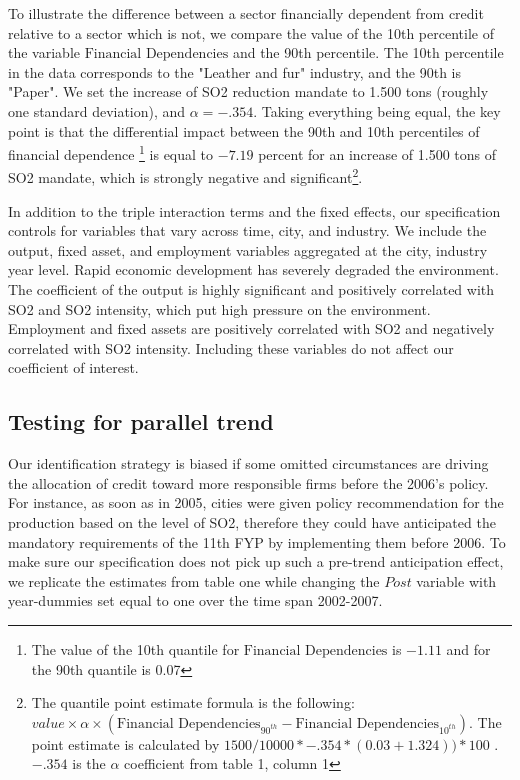 \documentclass[12pt]{article}
\begin{document}
To illustrate the difference between a sector financially dependent from credit relative to a sector which is not, we compare the value of the 10th percentile of the variable $\text{Financial Dependencies}$ and the 90th percentile. The 10th percentile in the data corresponds to the "Leather and fur" industry, and the 90th is "Paper". We set the increase of SO2 reduction mandate to 1.500 tons (roughly one standard deviation), and $\alpha= -.354$. Taking everything being equal, the key point is that the differential impact between the 90th and 10th percentiles of financial dependence \footnote{The value of the 10th quantile for  $\text{Financial Dependencies}$ is $-1.11$ and for the 90th quantile is 0.07} is equal to $-7.19$ percent for an increase of 1.500 tons of SO2 mandate, which is strongly negative and significant\footnote{The quantile point estimate formula is the following: $value \times \alpha \times (\text{Financial Dependencies}_{90^{th}} - \text{Financial Dependencies}_{10^{th}})$. The point estimate is calculated by $1500/10000 * -.354 * (0.03 + 1.324 )) * 100$ . $-.354$ is the $\alpha$ coefficient from table 1, column 1}.

In addition to the triple interaction terms and the fixed effects, our specification controls for variables that vary across time, city, and industry. We include the output, fixed asset, and employment variables aggregated at the city, industry year level. Rapid economic development has severely degraded the environment. The coefficient of the output is highly significant and positively correlated with SO2 and SO2 intensity, which put high pressure on the environment. Employment and fixed assets are positively correlated with SO2 and negatively correlated with SO2 intensity. Including these variables do not affect our coefficient of interest.

\subsection{Testing for parallel trend}

Our identification strategy is biased if some omitted circumstances are driving the allocation of credit toward more responsible firms before the 2006's policy. For instance, as soon as in 2005, cities were given policy recommendation for the production based on the level of SO2, therefore they could have anticipated the mandatory requirements of the 11th FYP by implementing them before 2006. To make sure our specification does not pick up such a pre-trend anticipation effect, we replicate the estimates from table one while changing the $Post$ variable with year-dummies set equal to one over the time span 2002-2007. 
\end{document}
